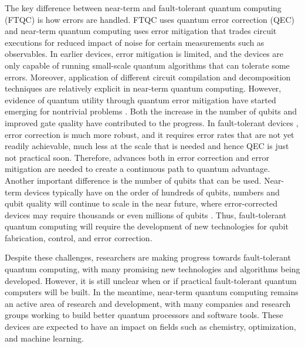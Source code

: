 \documentclass{article}
\begin{document}
The key difference between near-term and fault-tolerant quantum computing (FTQC) is how errors are handled. FTQC uses quantum error correction (QEC) and near-term quantum computing uses error mitigation that trades circuit executions for reduced impact of noise for certain measurements such as observables. In earlier devices, error mitigation \cite{cai2022quantum, kim2023recent} is limited, and the devices are only capable of running small-scale quantum algorithms that can tolerate some errors. Moreover, application of different circuit compilation \cite{madden2022best} and decomposition techniques \cite{piveteau2022circuit} are relatively explicit in near-term quantum computing. However, evidence of quantum utility through quantum error mitigation have started emerging for nontrivial problems \cite{kim2023evidence}. Both the increase in the number of qubits and improved gate quality have contributed to the progress. In fault-tolerant devices \cite{gottesman2022opportunities}, error correction is much more robust, and it requires error rates that are not yet readily achievable, much less at the scale that is needed and hence QEC is just not practical soon. Therefore, advances both in error correction and error mitigation are needed to create a continuous path to quantum advantage. Another important difference is the number of qubits that can be used. Near-term devices typically have on the order of hundreds of qubits, numbers and qubit quality will continue to scale in the near future, where error-corrected devices may require thousands or even millions of qubits \cite{gidney2021factor}. Thus, fault-tolerant quantum computing will require the development of new technologies for qubit fabrication, control, and error correction.

Despite these challenges, researchers are making progress towards fault-tolerant quantum computing, with many promising new technologies and algorithms being developed. However, it is still unclear when or if practical fault-tolerant quantum computers will be built. In the meantime, near-term quantum computing remains an active area of research and development, with many companies and research groups working to build better quantum processors and software tools. These devices are expected to have an impact on fields such as chemistry, optimization, and machine learning.
\end{document}
